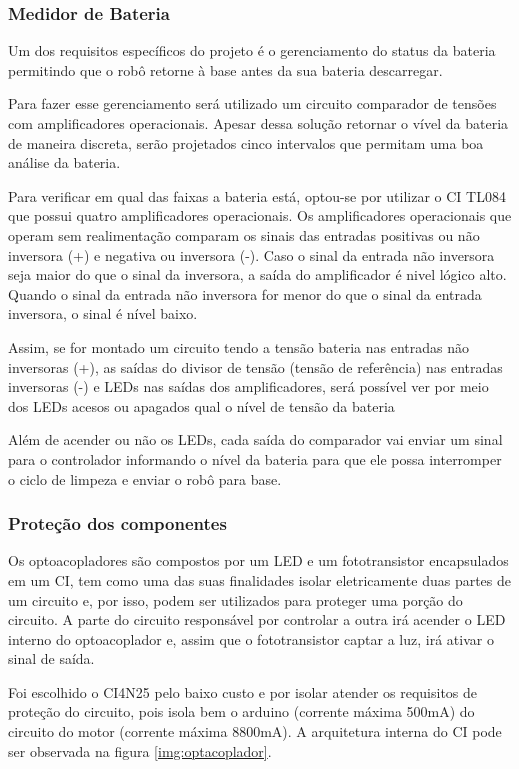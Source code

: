   \subsubsection{Medidor de Bateria}
  \label{sub:Medidor_de_bateria}
    Um dos requisitos específicos do projeto é o gerenciamento do status da bateria permitindo que o robô retorne à base antes da sua bateria descarregar.

    Para fazer esse gerenciamento será utilizado um circuito comparador de tensões com amplificadores operacionais. Apesar dessa solução retornar o vível da bateria de maneira discreta, serão projetados cinco intervalos que permitam uma boa análise da bateria.

    Para verificar em qual das faixas a bateria está, optou-se por utilizar o CI TL084 que possui quatro amplificadores operacionais. Os amplificadores operacionais que operam sem realimentação comparam os sinais das entradas positivas ou não inversora (+) e negativa ou inversora (-). Caso o sinal da entrada não inversora seja maior do que o sinal da inversora, a saída do amplificador é nivel lógico alto. Quando o sinal da entrada não inversora for menor do que o sinal da entrada inversora, o sinal é nível baixo.

    Assim, se for montado um circuito tendo a tensão bateria nas entradas não inversoras (+), as saídas do divisor de tensão (tensão de referência) nas entradas inversoras (-) e LEDs nas saídas dos amplificadores, será possível ver por meio dos LEDs acesos ou apagados qual o nível de tensão da bateria

    Além de acender ou não os LEDs, cada saída do comparador vai enviar um sinal para o controlador informando o nível da bateria para que ele possa interromper o ciclo de limpeza e enviar o robô para base.

    \subsubsection{Proteção dos componentes}
    \label{sub:Proteção_dos_componentes}
    Os optoacopladores são compostos por um LED e um fototransistor encapsulados em um CI, tem como uma das suas finalidades isolar eletricamente duas partes de um circuito e, por isso, podem ser utilizados para proteger uma porção do circuito. A parte do circuito responsável por controlar a outra irá acender o LED interno do optoacoplador e, assim que o fototransistor captar a luz, irá ativar o sinal de saída.

    Foi escolhido o CI4N25 pelo baixo custo e por isolar atender os requisitos de proteção do circuito, pois isola bem o arduino (corrente máxima 500mA) do circuito do motor (corrente máxima 8800mA). A arquitetura interna do CI pode ser observada na figura \ref{img:optacoplador}.

